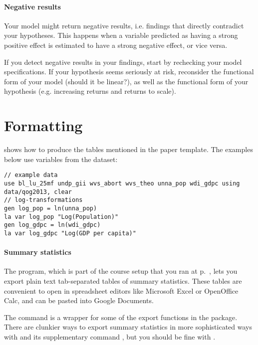 \paragraph{Negative results} Your model might return negative results, i.e. findings that directly contradict your hypotheses. This happens when a variable predicted as having a strong positive effect is estimated to have a strong negative effect, or vice versa.%

  If you detect negative results in your findings, start by rechecking your model specifications. If your hypothesis seems seriously at risk, reconsider the functional form of your model (should it be linear?), as well as the functional form of your hypothesis (e.g. increasing returns and returns to scale).%

%

\section{Formatting}

 shows how to produce the tables mentioned in the paper template. The examples below use variables from the \qog{} dataset:%

\begin{verbatim}
// example data
use bl_lu_25mf undp_gii wvs_abort wvs_theo unna_pop wdi_gdpc using data/qog2013, clear
// log-transformations
gen log_pop = ln(unna_pop)
la var log_pop "Log(Population)"
gen log_gdpc = ln(wdi_gdpc)
la var log_gdpc "Log(GDP per capita)"
\end{verbatim}

%
\paragraph{Summary statistics}%
  The  program, which is part of the course setup that you ran at p.~\pageref{sec:course-setup}, lets you export plain text tab-separated tables of summary statistics. These tables are convenient to open in spreadsheet editors like Microsoft Excel or OpenOffice Calc, and can be pasted into Google Documents.%

  The  command is a wrapper for some of the export functions in the  package. There are clunkier ways to export summary statistics in more sophisticated ways with  and its supplementary command , but you should be fine with .%

